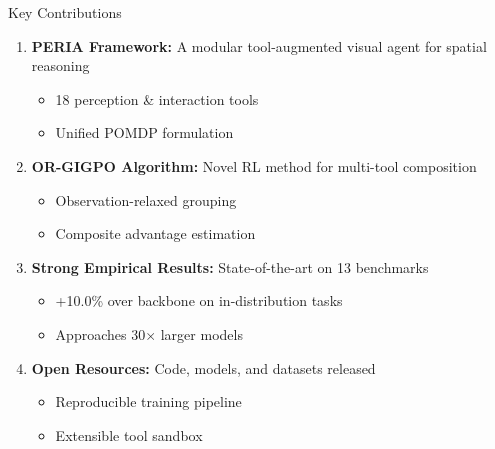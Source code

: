 \documentclass[aspectratio=169,xcolor=dvipsnames]{beamer}
\begin{document}
\begin{frame}{Key Contributions}
\begin{enumerate}
    \item \textbf{PERIA Framework:} A modular tool-augmented visual agent for spatial reasoning
    \begin{itemize}
        \item 18 perception \& interaction tools
        \item Unified POMDP formulation
    \end{itemize}

    \vspace{0.5em}

    \item \textbf{OR-GIGPO Algorithm:} Novel RL method for multi-tool composition
    \begin{itemize}
        \item Observation-relaxed grouping
        \item Composite advantage estimation
    \end{itemize}

    \vspace{0.5em}

    \item \textbf{Strong Empirical Results:} State-of-the-art on 13 benchmarks
    \begin{itemize}
        \item +10.0\% over backbone on in-distribution tasks
        \item Approaches 30$\times$ larger models
    \end{itemize}

    \vspace{0.5em}

    \item \textbf{Open Resources:} Code, models, and datasets released
    \begin{itemize}
        \item Reproducible training pipeline
        \item Extensible tool sandbox
    \end{itemize}
\end{enumerate}
\end{frame}
\end{document}
